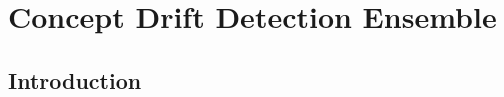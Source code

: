 \chapter{Concept Drift Detection Ensemble}
\label{sec:dde}

\lipsum[4]


\section{Introduction}

\lipsum[4]


